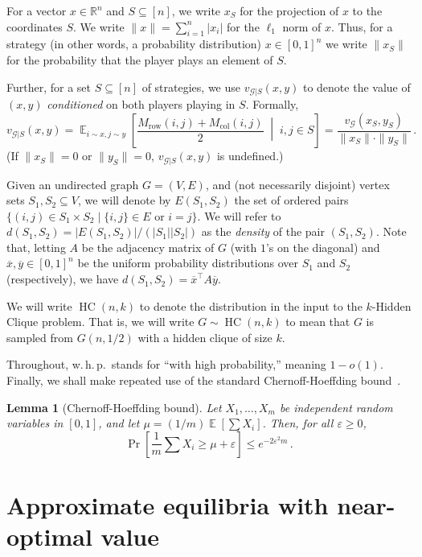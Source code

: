 \documentclass[10pt]{article}
\newtheorem{lemma}[theorem]{Lemma}
\theoremstyle{definition}
\numberwithin{equation}{section}
\newcommand{\Real}{\mathbb R}
\newcommand{\eps}{\varepsilon}
\newcommand{\G}{\mathcal{G}}
\newcommand{\HC}[2]{\operatorname{HC}(#1,#2)}
\DeclareMathOperator*{\E}{\mathbb{E}}
\begin{document}
For a vector $x \in \Real^n$ and $S \subseteq [n]$, we write $x_S$ for
the projection of $x$ to the coordinates $S$.  We write $\|x\| =
\sum_{i = 1}^n |x_i|$ for the $\ell_1$ norm of $x$.  Thus, for a
strategy (in other words, a probability distribution) $x \in [0,1]^n$
we write $\|x_S\|$ for the probability that the player plays an
element of $S$.

Further, for a set $S \subseteq [n]$ of strategies, we use
$v_{\G|S}(x,y)$ to denote the value of $(x,y)$ \emph{conditioned} on
both players playing in $S$.  Formally,
\[
v_{\G|S}(x,y) = \E_{i \sim x, j \sim y}\left[
  \frac{M_{\mathrm{row}}(i,j)+M_{\mathrm{col}}(i,j)}{2}\;\middle|\;
  i,j \in S\right] = \frac{v_\G(x_S, y_S)}{\|x_S\| \cdot \|y_S\|}\,.
\]
(If $\|x_S\| = 0$ or $\|y_S\| = 0$, $v_{\G|S}(x,y)$ is undefined.)

Given an undirected graph $G=(V,E)$, and (not necessarily disjoint) vertex sets $S_1,S_2\subseteq V$, we will denote by $E(S_1,S_2)$ the set of ordered pairs $\{(i,j)\in S_1\times S_2\mid \{i,j\}\in E\text{ or }i=j\}$. We will refer to $d(S_1,S_2)=|E(S_1,S_2)|/(|S_1||S_2|)$ as the \emph{density} of the pair $(S_1,S_2)$.  Note that, letting $A$ be the adjacency matrix of $G$  (with $1$'s on the diagonal) and $\overline{x}, \overline{y} \in [0,1]^n$ be the uniform probability distributions over $S_1$ and $S_2$ (respectively), we have $d(S_1, S_2) = \overline{x}^{\top} A \overline{y}$.

We will write $\HC{n}{k}$ to denote the distribution in the input to the $k$-Hidden Clique problem. That is, we will write $G\sim\HC{n}{k}$ to mean that $G$ is sampled from $G(n,1/2)$ with a hidden clique of size $k$.

Throughout, w.\,h.\,p.~stands for ``with high probability,'' meaning $1-o(1)$.  Finally, we
shall make repeated use of the standard Chernoff-Hoeffding
bound~\cite{Hoeff63}.

\begin{lemma}[Chernoff-Hoeffding bound]
  \label{lemma:chernoff}
  Let $X_1, \ldots, X_m$ be independent random variables in $[0,1]$, and let
  $\mu = ({1}/{m}) \E[ \sum X_i]$.  Then, for all $\eps \ge 0$,
  $$
  \Pr\left[ \frac{1}{m} \sum X_i \ge \mu + \eps \right] \le e^{-2\eps^2 m}\,.
  $$
\end{lemma}


\section{Approximate equilibria with near-optimal value}
\label{sec:goodvalue}
\end{document}
